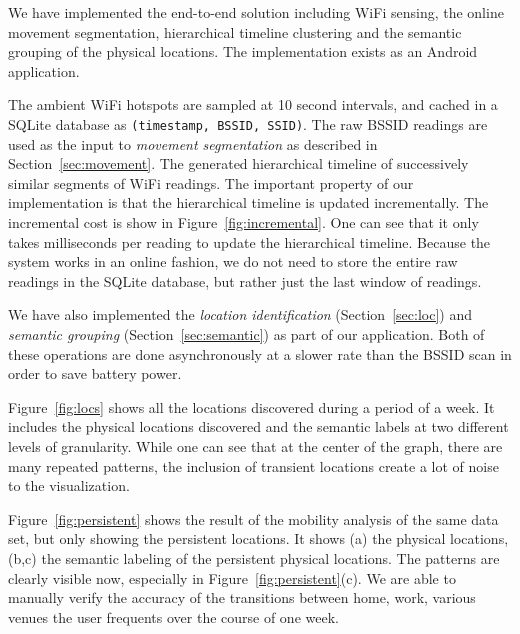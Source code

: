 We have implemented the end-to-end solution including WiFi
sensing, the online movement segmentation, hierarchical
timeline clustering and the semantic grouping of the
physical locations.  The implementation exists as an Android
application.

The ambient WiFi hotspots are sampled at 10 second intervals, and cached in a
SQLite database as \verb|(timestamp, BSSID, SSID)|.  The raw BSSID readings are
used as the input to {\em movement segmentation} as described in
Section~\ref{sec:movement}.  The generated hierarchical timeline of successively
similar segments of WiFi readings.  The important property of our implementation
is that the hierarchical timeline is updated incrementally.  The incremental cost
is show in Figure~\ref{fig:incremental}.  One can see that it only takes
milliseconds per reading to update the hierarchical timeline.  Because the
system works in an online fashion, we do not need to store the entire raw
readings in the SQLite database, but rather just the last window of readings.

We have also implemented the {\em location identification}
(Section~\ref{sec:loc}) and {\em semantic grouping}
(Section~\ref{sec:semantic}) as part of our application.
Both of these operations are done asynchronously at a slower rate than the BSSID
scan in order to save battery power.

Figure~\ref{fig:locs} shows all the locations discovered during a period of a
week.  It includes the physical locations discovered and the semantic labels at
two different levels of granularity.  While one can see that at the center of
the graph, there are many repeated patterns, the inclusion of transient
locations create a lot of noise to the visualization.

Figure~\ref{fig:persistent} shows the result of the mobility analysis of the
same data set, but only showing the persistent locations.  It shows (a) the
physical locations, (b,c) the semantic labeling of the persistent physical
locations.  The patterns are clearly visible now, especially in
Figure~\ref{fig:persistent}(c).  We are able to manually verify the accuracy of
the transitions between home, work, various venues the user frequents over the
course of one week.


